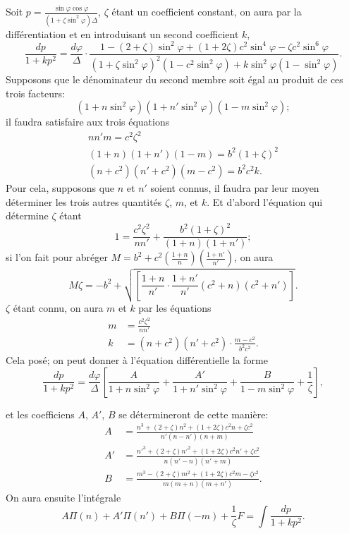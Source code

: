 \documentclass{article}
\begin{document}
Soit $p=\frac{\sin\varphi\cos\varphi}{(1+\zeta\sin^{2}\varphi)\Delta}$, $\zeta$ étant un coefficient constant, on aura par la différentiation et en introduisant un second coefficient $k$,
\[ \frac{dp}{1+kp^{2}}=\frac{d\varphi}{\Delta}\cdot\frac{1-(2+\zeta)\sin^{2}\varphi+(1+2\zeta)c^{2}\sin^{4}\varphi-\zeta c^{2}\sin^{6}\varphi}{(1+\zeta\sin^{2}\varphi)^{2}(1-c^{2}\sin^{2}\varphi)+k\sin^{2}\varphi(1-\sin^{2}\varphi)}. \]
Supposons que le dénominateur du second membre soit égal au produit de ces trois facteurs:
\[ (1+n\sin^{2}\varphi)(1+n'\sin^{2}\varphi)(1-m\sin^{2}\varphi); \]
il faudra satisfaire aux trois équations
\[ \begin{gathered} nn'm=c^{2}\zeta^{2}\\ (1+n)(1+n')(1-m)=b^{2}(1+\zeta)^{2}\\ (n+c^{2})(n'+c^{2})(m-c^{2})=b^{2}c^{2}k. \end{gathered} \]
Pour cela, supposons que $n$ et $n'$ soient connus, il faudra par leur moyen déterminer les trois autres quantités $\zeta$, $m$, et $k$. Et d'abord l'équation qui détermine $\zeta$ étant
\[ 1=\frac{c^{2}\zeta^{2}}{nn'}+\frac{b^{2}(1+\zeta)^{2}}{(1+n)(1+n')}; \]
si l'on fait pour abréger $M=b^{2}+c^{2}\left(\frac{1+n}{n}\right)\left(\frac{1+n'}{n'}\right)$, on aura
\[ M\zeta=-b^{2}+\sqrt{\left[\frac{1+n}{n'}\cdot\frac{1+n'}{n'}(c^{2}+n)(c^{2}+n')\right]}. \]
$\zeta$ étant connu, on aura $m$ et $k$ par les équations
\[ \begin{aligned} m&=\frac{c^{2}\zeta^{2}}{nn'}\\ k&=(n+c^{2})(n'+c^{2})\cdot\frac{m-c^{2}}{b^{2}c^{2}}. \end{aligned} \]
Cela posé; on peut donner à l'équation différentielle la forme
\[ \frac{dp}{1+kp^{2}}=\frac{d\varphi}{\Delta}\left[\frac{A}{1+n\sin^{2}\varphi}+\frac{A'}{1+n'\sin^{2}\varphi}+\frac{B}{1-m\sin^{2}\varphi}+\frac{1}{\zeta}\right], \]

et les coefficiens $A$, $A'$, $B$ se détermineront de cette manière:
\[ \begin{aligned} A&=\frac{n^{3}+(2+\zeta)n^{2}+(1+2\zeta)c^{2}n+\zeta c^{2}}{n'(n-n')(n+m)}\\ A'&=\frac{n'^{3}+(2+\zeta)n'^{2}+(1+2\zeta)c^{2}n'+\zeta c^{2}}{n(n'-n)(n'+m)}\\ B&=\frac{m^{3}-(2+\zeta)m^{2}+(1+2\zeta)c^{2}m-\zeta c^{2}}{m(m+n)(m+n')}. \end{aligned} \]
On aura ensuite l'intégrale
\[ A\Pi(n)+A'\Pi(n')+B\Pi(-m)+\frac{1}{\zeta}F=\int\frac{dp}{1+kp^{2}}. \]
\end{document}
